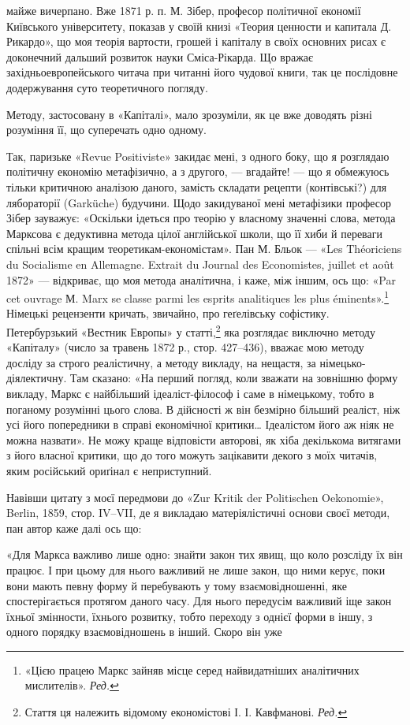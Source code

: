 \parcont{}  %
майже вичерпано. Вже 1871 р. п. М. Зібер, професор політичної
економії Київського університету, показав у своїй книзі «Теория
ценности и капитала Д. Рикардо», що моя теорія вартости, грошей
і капіталу в своїх основних рисах є доконечний дальший
розвиток науки Сміса-Рікарда. Що вражає західньоевропейського
читача при читанні його чудової книги, так це послідовне
додержування суто теоретичного погляду.

Методу, застосовану в «Капіталі», мало зрозуміли, як це вже
доводять різні розуміння її, що суперечать одно одному.

Так, паризьке «Revue Positiviste» закидає мені, з одного боку,
що я розглядаю політичну економію метафізично, а з другого, —
вгадайте! — що я обмежуюсь тільки критичною аналізою даного,
замість складати рецепти (контівські?) для лябораторії (Garküche)
будучини. Щодо закидуваної мені метафізики професор Зібер зауважує:
«Оскільки ідеться про теорію у власному значенні слова,
метода Марксова є дедуктивна метода цілої англійської школи,
що її хиби й переваги спільні всім кращим теоретикам-економістам».
Пан М. Бльок — «Les Théoriciens du Socialisme en Allemagne.
Extrait du Journal des Economistes, juillet et août 1872» —
відкриває, що моя метода аналітична, і каже, між іншим, ось що:
«Par cet ouvrage М. Marx se classe parmi les esprits analitiques les
plus éminents».\footnote*{
«Цією працею Маркс зайняв місце серед найвидатніших аналітичних
мислителів». \emph{Ред.}
} Німецькі рецензенти кричать, звичайно, про
геґелівську софістику. Петербурзький «Вестник Европы» у
статті,\footnote*{
Стаття ця належить відомому економістові І. І. Кавфманові. \emph{Ред.}
} яка розглядає виключно методу «Капіталу» (число за
травень 1872 р., стор. 427--436), вважає мою методу досліду за
строго реалістичну, а методу викладу, на нещастя, за німецько-діялектичну.
Там сказано: «На перший погляд, коли зважати на
зовнішню форму викладу, Маркс є найбільший ідеаліст-філософ
і саме в німецькому, тобто в поганому розумінні цього слова.
В дійсності ж він безмірно більший реаліст, ніж усі його попередники
в справі економічної критики\dots{} Ідеалістом його аж ніяк не
можна назвати». Не можу краще відповісти авторові, як хіба
декількома витягами з його власної критики, що до того можуть
зацікавити декого з моїх читачів, яким російський ориґінал є
неприступний.

Навівши цитату з моєї передмови до «\textgerman{Zur Kritik der Politischen
Oekonomie}», Berlin, 1859, стор. IV--VII, де я викладаю
матеріялістичні основи своєї методи, пан автор каже далі ось що:

«Для Маркса важливо лише одно: знайти закон тих явищ, що
коло розсліду їх він працює. І при цьому для нього важливий не
лише закон, що ними керує, поки вони мають певну форму й перебувають
у тому взаємовідношенні, яке спостерігається протягом
даного часу. Для нього передусім важливий іще закон їхньої
змінности, їхнього розвитку, тобто переходу з однієї форми в
іншу, з одного порядку взаємовідношень в інший. Скоро він уже
\parbreak{}  %
